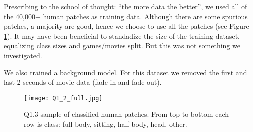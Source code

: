 Prescribing to the school of thought: ``the more data the better'', we used all of the 40,000+ human patches as training data.
Although there are some spurious patches, a majority are good, hence we choose to use all the patches (see Figure \ref{fig:Q1_3}).
It may have been beneficial to standadize the size of the training dataset, equalizing class sizes and games/movies split.
But this was not something we investigated.

We also trained a background model.
For this dataset we removed the first and last 2 seconds of movie data (fade in and fade out).

\begin{figure}[h!]
  \begin{center}
  \texttt{[image: Q1\_2\_full.jpg]}
    \caption{Q1.3 sample of classified human patches. From top to bottom each row is class: full-body, sitting, half-body, head, other.}
    \label{fig:Q1_3}
  \end{center}
  \end{figure}